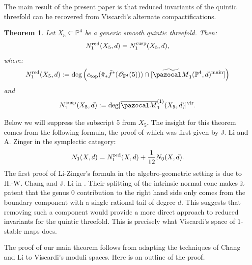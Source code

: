 \documentclass[11pt]{amsart}
\newcommand{\Mone}[3]{\overline{\pazocal M}^{(1)}_{#1}(#2,#3)}
\newcommand{\PP}{\mathbb P}
\newcommand{\oM}{\overline{\pazocal M}}
\theoremstyle{plain}
\newtheorem{thm}{Theorem}[section]
\theoremstyle{definition}
\begin{document}
The main result of the present paper is that reduced invariants of the quintic threefold can be recovered from Viscardi's alternate compactifications.

\begin{thm}
Let $X_5\subseteq\PP^4$ be a generic smooth quintic threefold. Then:
\[
N_1^{\rm{red}}(X_5,d)=N_1^{\rm{cusp}}(X_5,d),
\]
where:
\[N_1^{\rm{red}}(X_5,d):=\deg \left(c_{\rm{top}}(\tilde\pi_*\tilde f^*(\mathcal O_{\PP^4}(5)))\cap [\widetilde{\pazocal M}_{1}(\PP^4,d)^{\rm{main}}]\right)\]
and
\[N_1^{\rm{cusp}}(X_5,d):=\deg [\Mone{1}{X_5}{d}]^{\rm{vir}}.
\]
\end{thm}

Below we will suppress the subscript $5$ from $X_5$. The insight for this theorem comes from the following formula, the proof of which was first given by J. Li and A. Zinger \cite{LZ} in the symplectic category:
\begin{equation}\label{eq:VakilZinger}
N_1(X,d)=N_1^{\rm{red}}(X,d)+\frac{1}{12}N_0(X,d).
\end{equation}
The first proof of Li-Zinger's formula in the algebro-geometric setting is due to H.-W. Chang and J. Li in \cite{CL}. Their splitting of the intrinsic normal cone makes it patent that the genus $0$ contribution to the right hand side only comes from the boundary component with a single rational tail of degree $d$. This suggests that removing such a component would provide a more direct approach to reduced invariants for the quintic threefold. This is precisely what Viscardi's space of $1$-stable maps does.


The proof of our main theorem follows from adapting the techniques of Chang and Li to Viscardi's moduli spaces. Here is an outline of the proof.
\end{document}
